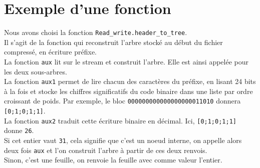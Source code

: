\documentclass{article}
\begin{document}
  \section*{Exemple d'une fonction}
  Nous avons choisi la fonction \texttt{Read\_write.header\_to\_tree}. \\
  Il s'agit de la fonction qui reconstruit l'arbre stocké au début du fichier compressé, en écriture préfixe. \\
  La fonction \texttt{aux} lit sur le stream et construit l'arbre. Elle est ainsi appelée pour les deux sous-arbres. \\
  La fonction \texttt{aux1} permet de lire chacun des caractères du préfixe, en lisant 24 bits à la fois et stocke les chiffres significatifs du code binaire dans une liste par ordre croissant de poids. Par exemple, le bloc \texttt{000000000000000000011010} donnera \texttt{[0;1;0;1;1]}. \\
  La fonction \texttt{aux2} traduit cette écriture binaire en décimal. Ici, \texttt{[0;1;0;1;1]} donne \texttt{26}. \\
  Si cet entier vaut \texttt{31}, cela signifie que c'est un noeud interne, on appelle alors deux fois \texttt{aux} et l'on construit l'arbre à partir de ces deux renvois. \\
  Sinon, c'est une feuille, on renvoie la feuille avec comme valeur l'entier.
\end{document}
